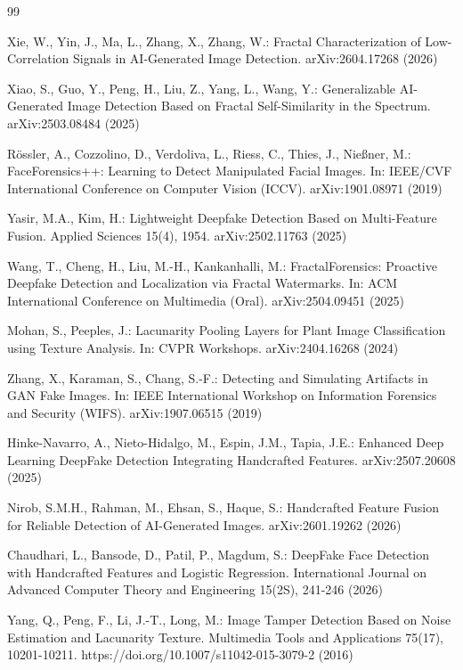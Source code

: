 \documentclass[11pt]{article}
\begin{document}
\begin{thebibliography}{99}
\setlength{\itemsep}{2pt}

 Xie, W., Yin, J., Ma, L., Zhang, X., Zhang, W.: Fractal Characterization of Low-Correlation Signals in AI-Generated Image Detection. arXiv:2604.17268 (2026)

 Xiao, S., Guo, Y., Peng, H., Liu, Z., Yang, L., Wang, Y.: Generalizable AI-Generated Image Detection Based on Fractal Self-Similarity in the Spectrum. arXiv:2503.08484 (2025)

 R\"ossler, A., Cozzolino, D., Verdoliva, L., Riess, C., Thies, J., Nie\ss ner, M.: FaceForensics++: Learning to Detect Manipulated Facial Images. In: IEEE/CVF International Conference on Computer Vision (ICCV). arXiv:1901.08971 (2019)

 Yasir, M.A., Kim, H.: Lightweight Deepfake Detection Based on Multi-Feature Fusion. Applied Sciences 15(4), 1954. arXiv:2502.11763 (2025)

 Wang, T., Cheng, H., Liu, M.-H., Kankanhalli, M.: FractalForensics: Proactive Deepfake Detection and Localization via Fractal Watermarks. In: ACM International Conference on Multimedia (Oral). arXiv:2504.09451 (2025)

 Mohan, S., Peeples, J.: Lacunarity Pooling Layers for Plant Image Classification using Texture Analysis. In: CVPR Workshops. arXiv:2404.16268 (2024)

 Zhang, X., Karaman, S., Chang, S.-F.: Detecting and Simulating Artifacts in GAN Fake Images. In: IEEE International Workshop on Information Forensics and Security (WIFS). arXiv:1907.06515 (2019)

 Hinke-Navarro, A., Nieto-Hidalgo, M., Espin, J.M., Tapia, J.E.: Enhanced Deep Learning DeepFake Detection Integrating Handcrafted Features. arXiv:2507.20608 (2025)

 Nirob, S.M.H., Rahman, M., Ehsan, S., Haque, S.: Handcrafted Feature Fusion for Reliable Detection of AI-Generated Images. arXiv:2601.19262 (2026)

 Chaudhari, L., Bansode, D., Patil, P., Magdum, S.: DeepFake Face Detection with Handcrafted Features and Logistic Regression. International Journal on Advanced Computer Theory and Engineering 15(2S), 241-246 (2026)

 Yang, Q., Peng, F., Li, J.-T., Long, M.: Image Tamper Detection Based on Noise Estimation and Lacunarity Texture. Multimedia Tools and Applications 75(17), 10201-10211. https://doi.org/10.1007/s11042-015-3079-2 (2016)


\end{thebibliography}
\end{document}
